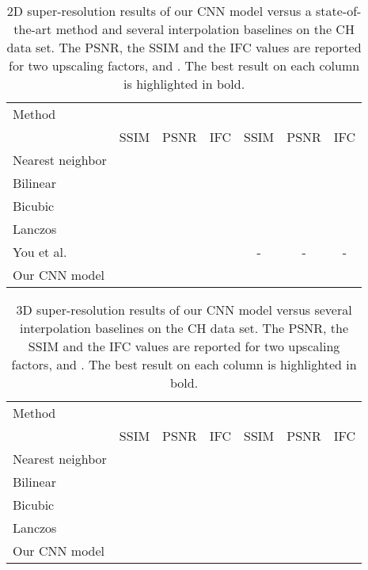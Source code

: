 \documentclass{ieeeaccess}
\begin{document}
\begin{table*}[!t]
\caption{2D super-resolution results of our CNN model versus a state-of-the-art method \cite{You-TMI-2019} and several interpolation baselines on the CH data set. The PSNR, the SSIM and the IFC values are reported for two upscaling factors,  and . The best result on each column is highlighted in bold.}\label{tab_ch_results_2d}
\begin{center}
\begin{tabular}{|l|c|c|c|c|c|c|}
\hline 
Method						& \multicolumn{3}{|c|}{}					& \multicolumn{3}{|c|}{} \\
\cline{2-7}				& SSIM				& PSNR			& IFC           			& SSIM				& PSNR			& IFC\\
\hline
\hline
Nearest neighbor		&  		& 	& 				& 		& 	& \\ 
\hline  
Bilinear						& 		& 	& 				& 		& 	& \\ 
\hline  
Bicubic						& 		& 	& 				& 		& 	& \\ 
\hline   
Lanczos					& 		& 	& 				& 		& 	& \\  
\hline
You et al.~\cite{You-TMI-2019} & 		& 	& 		& -					& -				& -\\  
\hline 
Our CNN model		&  & 	&  &  &  & \\ 
\hline 
\end{tabular}
\end{center} 
\end{table*}

\begin{table*}[!t]
\caption{3D super-resolution results of our CNN model versus several interpolation baselines on the CH data set. The PSNR, the SSIM and the IFC values are reported for two upscaling factors,  and . The best result on each column is highlighted in bold.}\label{tab_ch_results_3d}
\begin{center}
\begin{tabular}{|l|c|c|c|c|c|c|}
\hline 
Method & \multicolumn{3}{|c|}{} & \multicolumn{3}{|c|}{} \\
\cline{2-7}				& SSIM				& PSNR			& IFC           			& SSIM				& PSNR			& IFC\\
\hline  
\hline  
Nearest neighbor		& 		& 	& 				& 		& 	& \\ 
\hline  
Bilinear						& 		& 	&					& 		&  	& \\ 
\hline  
Bicubic						& 		& 	&					& 		&  	& \\ 
\hline   
Lanczos					& 		& 	&					& 		& 	& \\  
\hline 
Our CNN model		&  &  & 	&  &  & \\ 
\hline 
\end{tabular}
\end{center}
\end{table*}
\end{document}
